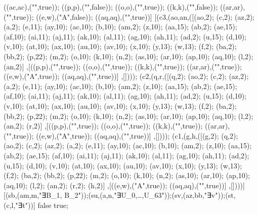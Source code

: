 ((ac,ac),("",true)); ((p,p),("",false)); ((o,o),("\mrot{{\tt i}∈[2\upto32)}",true)); ((k,k),("",false)); ((ar,ar),("",true)); ((e,w),("\state A",false)); ((aq,aq),("",true))] [(c3,(ao,an,([(ao,2); (c,2); (az,2); (a,2); (e,11); (ay,10); (ac,10); (b,10); (am,2); (z,10); (aa,15); (ab,2); (ae,15); (af,10); (ai,11); (aj,11); (ak,10); (al,11); (ag,10); (ah,11); (ad,2); (u,15); (d,10); (v,10); (at,10); (ax,10); (au,10); (av,10); (x,10); (y,13); (w,13); (f,2); (ba,2); (bb,2); (p,22); (m,2); (o,10); (k,10); (n,2); (as,10); (ar,10); (ap,10); (aq,10); (l,2); (an,2)] ,[((p,p),("\mrot{∀i∈[0\upto32-{\tt idx})．{}\\{}{\tt smallbits}_{[i]} = {}\\{} {\tt smallmap}_{[i+{\tt idx}]}}",true)); ((o,o),("",true)); ((k,k),("",true)); ((ar,ar),("",true)); ((e,w),("\state A",true)); ((aq,aq),("",true))] ,[]))); (c2,(q,r,([(q,2); (ao,2); (c,2); (az,2); (a,2); (e,11); (ay,10); (ac,10); (b,10); (am,2); (z,10); (aa,15); (ab,2); (ae,15); (af,10); (ai,11); (aj,11); (ak,10); (al,11); (ag,10); (ah,11); (ad,2); (u,15); (d,10); (v,10); (at,10); (ax,10); (au,10); (av,10); (x,10); (y,13); (w,13); (f,2); (ba,2); (bb,2); (p,22); (m,2); (o,10); (k,10); (n,2); (as,10); (ar,10); (ap,10); (aq,10); (l,2); (an,2); (r,2)] ,[((p,p),("\mrot{∀i∈[0\upto32-{\tt idx})．{}\\{}{\tt smallbits}_{[i]} = {}\\{} {\tt smallmap}_{[i+{\tt idx}]}}",true)); ((o,o),("",true)); ((k,k),("",true)); ((ar,ar),("",true)); ((e,w),("\state A",true)); ((aq,aq),("",true))] ,[]))); (c1,(g,h,([(g,2); (q,2); (ao,2); (c,2); (az,2); (a,2); (e,11); (ay,10); (ac,10); (b,10); (am,2); (z,10); (aa,15); (ab,2); (ae,15); (af,10); (ai,11); (aj,11); (ak,10); (al,11); (ag,10); (ah,11); (ad,2); (u,15); (d,10); (v,10); (at,10); (ax,10); (au,10); (av,10); (x,10); (y,13); (w,13); (f,2); (ba,2); (bb,2); (p,22); (m,2); (o,10); (k,10); (n,2); (as,10); (ar,10); (ap,10); (aq,10); (l,2); (an,2); (r,2); (h,2)] ,[((e,w),("\state A",true)); ((aq,aq),("",true))] ,[])))] [(sb,(am,m,"∃B_1, B_2"));(su,(a,n,"∃U_0,\ldots,U_{63}"));(sv,(az,bb,"∃v"));(st,(c,l,"∃t"))] false true;
